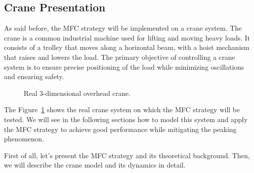 \subsection{Crane Presentation}

As said before, the MFC strategy will be implemented on a crane system. The crane is a common 
industrial machine used for lifting and moving heavy loads. It consists of a trolley that moves along a 
horizontal beam, with a hoist mechanism that raises and lowers the load. The primary objective 
of controlling a crane system is to ensure precise positioning of the load while minimizing 
oscillations and ensuring safety.

\begin{figure}[htbp]
    \centering
    \caption{Real 3-dimensional overhead crane.}
    \label{fig:Real_3D_Crane}
\end{figure}

The Figure~\ref{fig:Real_3D_Crane} shows the real crane system on which the MFC strategy will be tested. 
We will see in the following sections how to model this system and apply the MFC strategy to achieve 
good performance while mitigating the peaking phenomenon.

First of all, let's present the MFC strategy and its theoretical background. Then, we will 
describe the crane model and its dynamics in detail.

